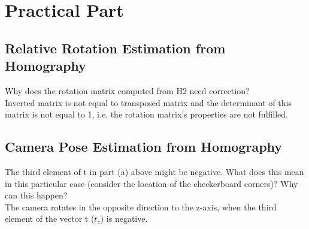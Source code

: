 \documentclass[a4paper, twoside, english]{article}
\begin{document}
\section{Practical Part}
\subsection{Relative Rotation Estimation from Homography}
Why does the rotation matrix computed from H2 need correction?\\
Inverted matrix is not equal to transposed matrix and the determinant of this matrix is not equal to 1, i.e. the rotation matrix's properties are not fulfilled.
\subsection{Camera Pose Estimation from Homography}
The third element of t in part (a) above might be negative. What does this mean in this particular case (consider the location of the checkerboard corners)? Why can this happen?\\
The camera rotates in the opposite direction to the z-axis, when the third element of the vector t ($t_z$) is negative.







\end{document}

